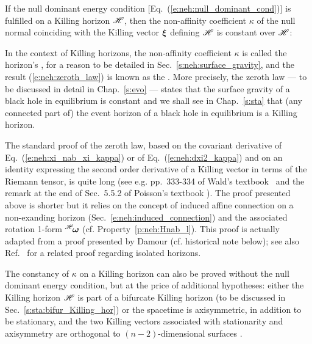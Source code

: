 \begin{prop}
\label{p:neh:zeroth_law}
If the null dominant energy condition
[Eq.~(\ref{e:neh:null_dominant_cond})]
is fulfilled on a Killing horizon $\mathscr{H}$, then the non-affinity coefficient $\kappa$
of the null normal coinciding with the Killing vector $\bm{\xi}$ defining $\mathscr{H}$
is constant over $\mathscr{H}$:
\be \label{e:neh:zeroth_law}
\ee
\end{prop}
In the context of Killing horizons, the non-affinity coefficient $\kappa$ is
called the horizon's ,
for a reason to be detailed in Sec.~\ref{s:neh:surface_gravity},
and the result
(\ref{e:neh:zeroth_law}) is known as the
. More precisely,
the zeroth law --- to be discussed in detail in Chap.~\ref{s:evo} ---
states that the surface gravity of a black hole in equilibrium is
constant and we shall see in Chap.~\ref{s:sta} that (any connected part of)
the event horizon of a black hole in equilibrium is a Killing horizon.


\begin{remark}
The standard proof of the zeroth law, based on the covariant derivative
of Eq.~(\ref{e:neh:xi_nab_xi_kappa}) \cite{BardeCH73,Wald84} or of Eq.~(\ref{e:neh:dxi2_kappa})
\cite{Heusl96} and on an identity expressing the second order derivative of
a Killing vector in terms of the Riemann tensor, is quite long (see
e.g. pp.~333-334 of Wald's textbook~\cite{Wald84} and the remark at the end of Sec.~5.5.2 of Poisson's
textbook \cite{Poiss04}). The proof presented above is shorter but it relies on
the concept of induced affine connection on a non-exanding horizon
(Sec.~\ref{e:neh:induced_connection}) and the associated rotation
1-form ${}^{\mathscr{H}}\!\bm{\omega}$ (cf.
Property~\ref{p:neh:Hnab_l}). This proof is actually adapted from a proof
presented by Damour \cite{Damou79,Damou82} (cf. historical note below); see
also Ref.~\cite{AshteBL01} for a related proof regarding isolated horizons.
\end{remark}

\begin{remark}
\label{r:neh:zero_law_wo_NDEC}
The constancy of $\kappa$ on a Killing horizon can also be proved without the
null dominant energy condition, but at the price of additional hypotheses:
either the Killing horizon $\mathscr{H}$ is part of a bifurcate Killing horizon
(to be discussed in Sec.~\ref{s:sta:bifur_Killing_hor}) \cite{KayW91,Wald92,Poiss04}
or the spacetime is axisymmetric, in addition to be stationary, and
the two Killing vectors associated
with stationarity and
axisymmetry are orthogonal to $(n-2)$-dimensional
surfaces \cite{Carte73b,RaczW96}.
\end{remark}

